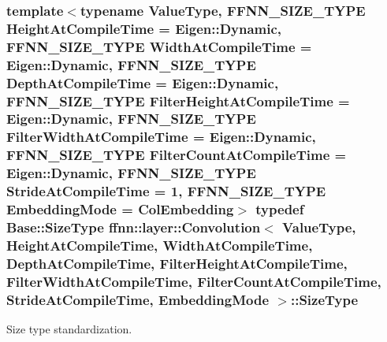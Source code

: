 \hypertarget{classffnn_1_1layer_1_1_convolution_ab0f68575e459597264bbe4451a6299bd}{
\subsubsection[{Size\-Type}]{\setlength{\rightskip}{0pt plus 5cm}template$<$typename Value\-Type, F\-F\-N\-N\-\_\-\-S\-I\-Z\-E\-\_\-\-T\-Y\-P\-E Height\-At\-Compile\-Time = Eigen\-::\-Dynamic, F\-F\-N\-N\-\_\-\-S\-I\-Z\-E\-\_\-\-T\-Y\-P\-E Width\-At\-Compile\-Time = Eigen\-::\-Dynamic, F\-F\-N\-N\-\_\-\-S\-I\-Z\-E\-\_\-\-T\-Y\-P\-E Depth\-At\-Compile\-Time = Eigen\-::\-Dynamic, F\-F\-N\-N\-\_\-\-S\-I\-Z\-E\-\_\-\-T\-Y\-P\-E Filter\-Height\-At\-Compile\-Time = Eigen\-::\-Dynamic, F\-F\-N\-N\-\_\-\-S\-I\-Z\-E\-\_\-\-T\-Y\-P\-E Filter\-Width\-At\-Compile\-Time = Eigen\-::\-Dynamic, F\-F\-N\-N\-\_\-\-S\-I\-Z\-E\-\_\-\-T\-Y\-P\-E Filter\-Count\-At\-Compile\-Time = Eigen\-::\-Dynamic, F\-F\-N\-N\-\_\-\-S\-I\-Z\-E\-\_\-\-T\-Y\-P\-E Stride\-At\-Compile\-Time = 1, F\-F\-N\-N\-\_\-\-S\-I\-Z\-E\-\_\-\-T\-Y\-P\-E Embedding\-Mode = Col\-Embedding$>$ typedef {\bf Base\-::\-Size\-Type} {\bf ffnn\-::layer\-::\-Convolution}$<$ Value\-Type, Height\-At\-Compile\-Time, Width\-At\-Compile\-Time, Depth\-At\-Compile\-Time, Filter\-Height\-At\-Compile\-Time, Filter\-Width\-At\-Compile\-Time, Filter\-Count\-At\-Compile\-Time, Stride\-At\-Compile\-Time, {\bf Embedding\-Mode} $>$\-::{\bf Size\-Type}}}\label{classffnn_1_1layer_1_1_convolution_ab0f68575e459597264bbe4451a6299bd}


Size type standardization. 



